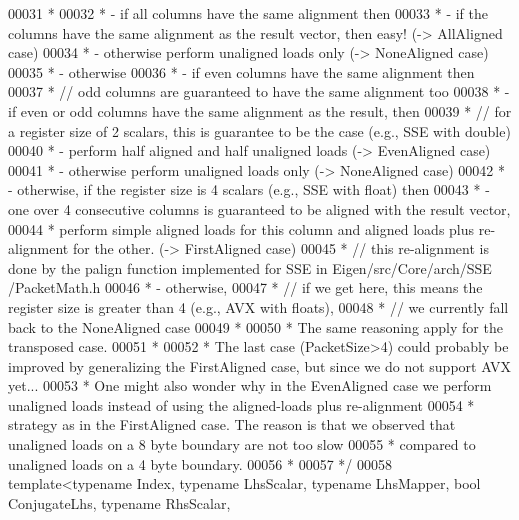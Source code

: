 \begin{DoxyCode}
00031 \textcolor{comment}{ *}
00032 \textcolor{comment}{ * - if all columns have the same alignment then}
00033 \textcolor{comment}{ *   - if the columns have the same alignment as the result vector, then easy! (-> AllAligned case)}
00034 \textcolor{comment}{ *   - otherwise perform unaligned loads only (-> NoneAligned case)}
00035 \textcolor{comment}{ * - otherwise}
00036 \textcolor{comment}{ *   - if even columns have the same alignment then}
00037 \textcolor{comment}{ *     // odd columns are guaranteed to have the same alignment too}
00038 \textcolor{comment}{ *     - if even or odd columns have the same alignment as the result, then}
00039 \textcolor{comment}{ *       // for a register size of 2 scalars, this is guarantee to be the case (e.g., SSE with double)}
00040 \textcolor{comment}{ *       - perform half aligned and half unaligned loads (-> EvenAligned case)}
00041 \textcolor{comment}{ *     - otherwise perform unaligned loads only (-> NoneAligned case)}
00042 \textcolor{comment}{ *   - otherwise, if the register size is 4 scalars (e.g., SSE with float) then}
00043 \textcolor{comment}{ *     - one over 4 consecutive columns is guaranteed to be aligned with the result vector,}
00044 \textcolor{comment}{ *       perform simple aligned loads for this column and aligned loads plus re-alignment for the other.
       (-> FirstAligned case)}
00045 \textcolor{comment}{ *       // this re-alignment is done by the palign function implemented for SSE in Eigen/src/Core/arch/SSE
      /PacketMath.h}
00046 \textcolor{comment}{ *   - otherwise,}
00047 \textcolor{comment}{ *     // if we get here, this means the register size is greater than 4 (e.g., AVX with floats),}
00048 \textcolor{comment}{ *     // we currently fall back to the NoneAligned case}
00049 \textcolor{comment}{ *}
00050 \textcolor{comment}{ * The same reasoning apply for the transposed case.}
00051 \textcolor{comment}{ *}
00052 \textcolor{comment}{ * The last case (PacketSize>4) could probably be improved by generalizing the FirstAligned case, but since
       we do not support AVX yet...}
00053 \textcolor{comment}{ * One might also wonder why in the EvenAligned case we perform unaligned loads instead of using the
       aligned-loads plus re-alignment}
00054 \textcolor{comment}{ * strategy as in the FirstAligned case. The reason is that we observed that unaligned loads on a 8 byte
       boundary are not too slow}
00055 \textcolor{comment}{ * compared to unaligned loads on a 4 byte boundary.}
00056 \textcolor{comment}{ *}
00057 \textcolor{comment}{ */}
00058 \textcolor{keyword}{template}<\textcolor{keyword}{typename} Index, \textcolor{keyword}{typename} LhsScalar, \textcolor{keyword}{typename} LhsMapper, \textcolor{keywordtype}{bool} ConjugateLhs, \textcolor{keyword}{typename} RhsScalar, \textcolor{keyword}{
}
\end{DoxyCode}
